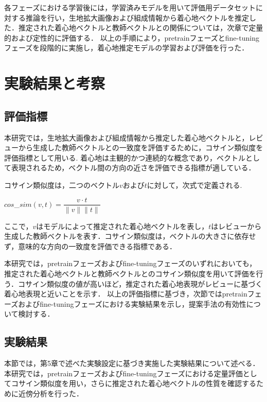 \documentclass[a4paper,12pt]{jreport}
\begin{document}
各フェーズにおける学習後には，学習済みモデルを用いて評価用データセットに対する推論を行い，生地拡大画像および組成情報から着心地ベクトルを推定した．推定された着心地ベクトルと教師ベクトルとの関係については，次章で定量的および定性的に評価する．
以上の手順により，pretrainフェーズとfine-tuningフェーズを段階的に実施し，着心地推定モデルの学習および評価を行った．


\chapter{実験結果と考察}

\section{評価指標}
本研究では，生地拡大画像および組成情報から推定した着心地ベクトルと，レビューから生成した教師ベクトルとの一致度を評価するために，コサイン類似度を評価指標として用いる. 着心地は主観的かつ連続的な概念であり，ベクトルとして表現されるため，ベクトル間の方向の近さを評価できる指標が適している．

コサイン類似度は，二つのベクトル$v$および$t$に対して，次式で定義される.

\begin{center}
   $cos$\_$sim(v,t)=\dfrac{v\cdot t}{\|v\|\|t\|} $ 
\end{center}

ここで，$v$はモデルによって推定された着心地ベクトルを表し，$t$はレビューから生成した教師ベクトルを表す．コサイン類似度は，ベクトルの大きさに依存せず，意味的な方向の一致度を評価できる指標である．

本研究では，pretrainフェーズおよびfine-tuningフェーズのいずれにおいても，推定された着心地ベクトルと教師ベクトルとのコサイン類似度を用いて評価を行う．コサイン類似度の値が高いほど，推定された着心地表現がレビューに基づく着心地表現と近いことを示す．
以上の評価指標に基づき，次節ではpretrainフェーズおよびfine-tuningフェーズにおける実験結果を示し，提案手法の有効性について検討する．

\section{実験結果}

本節では，第5章で述べた実験設定に基づき実施した実験結果について述べる．本研究では，pretrainフェーズおよびfine-tuningフェーズにおける定量評価としてコサイン類似度を用い，さらに推定された着心地ベクトルの性質を確認するために近傍分析を行った．
\end{document}

